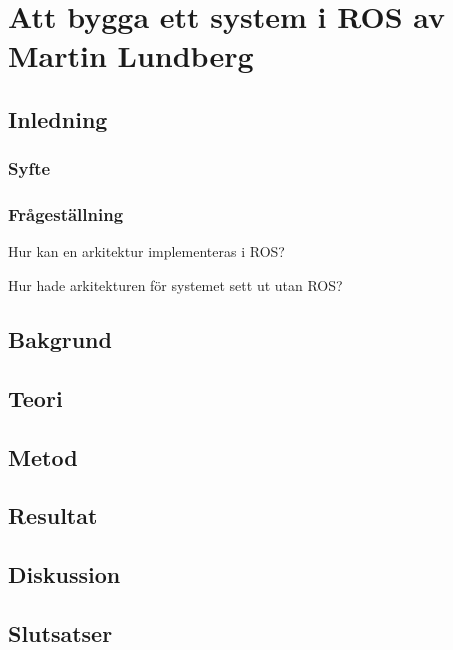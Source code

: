 \chapter{Att bygga ett system i ROS av Martin Lundberg}
\label{cha:indiv-report-person}

\section{Inledning}
\label{sec:introduction-person}



\subsection{Syfte}
\label{sec:purpose-person}


\subsection{Frågeställning}
\label{sec:issue-person}

Hur kan en arkitektur implementeras i ROS?

Hur hade arkitekturen för systemet sett ut utan ROS?

\section{Bakgrund}
\label{sec:background-person}


\section{Teori}
\label{sec:theory-person}


\section{Metod}
\label{sec:method-person}


\section{Resultat}
\label{sec:results-person}


\section{Diskussion}
\label{sec:discussion-person}


\section{Slutsatser}
\label{sec:conclusions-person}


